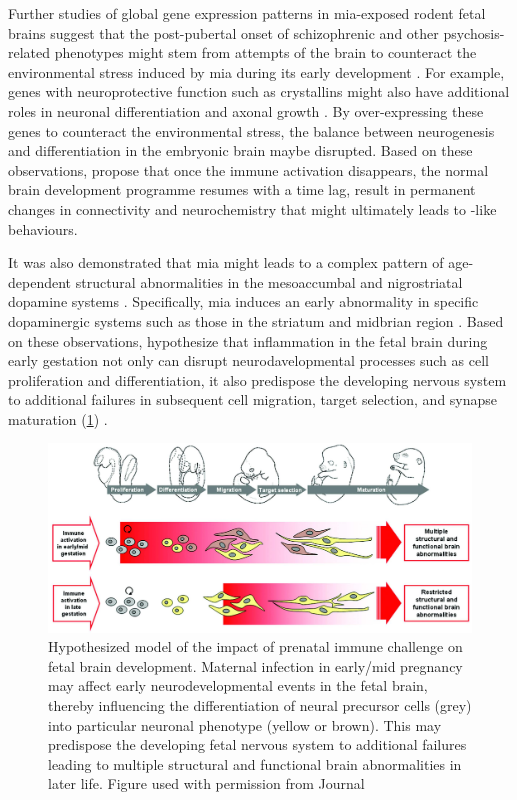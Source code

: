 	Further studies of global gene expression patterns in \gls{mia}-exposed rodent fetal brains \citep{Oskvig2012,Garbett2012a} suggest that the post-pubertal onset of schizophrenic and other psychosis-related phenotypes might stem from attempts of the brain to counteract the environmental stress induced by \gls{mia} during its early development \citep{Garbett2012a}.
	For example, genes with neuroprotective function such as crystallins might also have additional roles in neuronal differentiation and axonal growth \citep{Garbett2012a}. 
	By over-expressing these genes to counteract the environmental stress, the balance between neurogenesis and differentiation in the embryonic brain maybe disrupted. 
	Based on these observations, \citet{Garbett2012a} propose that once the immune activation disappears, the normal brain development programme resumes with a time lag, result in permanent changes in connectivity and neurochemistry that might ultimately leads to -like behaviours.
	
	It was also demonstrated that \gls{mia} might leads to a complex pattern of age-dependent structural abnormalities in the mesoaccumbal and nigrostriatal dopamine systems \citep{Vuillermot2010}.
	Specifically, \gls{mia} induces an early abnormality in specific dopaminergic systems such as those in the striatum and midbrian region \citep{Vuillermot2010}.
	Based on these observations, \citet{Meyer2007a} hypothesize that inflammation in the fetal brain during early gestation not only can disrupt neurodavelopmental processes such as cell proliferation and differentiation, it also predispose the developing nervous system to additional failures in subsequent cell migration, target selection, and synapse maturation (\cref{fig:miaEffect}) \citep{Meyer2007a}.
	\begin{figure}
		\centering
		\includegraphics[width=\textwidth]{figure/mia_impact.jpg}
		\caption[Hypothesized model of the impact of prenatal immune challenge on fetal brain development]{Hypothesized model of the impact of prenatal immune challenge on fetal brain development.
			Maternal infection in early/mid pregnancy may affect early neurodevelopmental events in the fetal brain, thereby influencing the differentiation of neural precursor cells (grey) into particular neuronal phenotype (yellow or brown).
			This may predispose the developing fetal nervous system to additional failures leading to multiple structural and functional brain abnormalities in later life.
			Figure used with permission from Journal \citep{Meyer2007a}}
		\label{fig:miaEffect}
	\end{figure}
	
